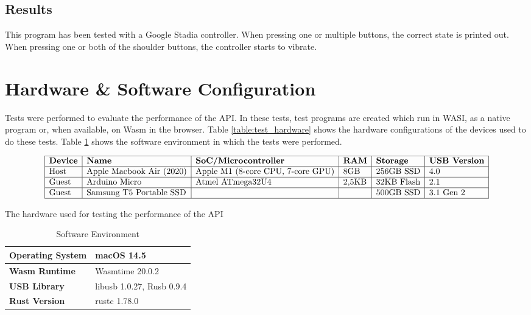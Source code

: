 \subsection{Results}
This program has been tested with a Google Stadia controller. When pressing one or multiple buttons, the correct state is printed out. When pressing one or both of the shoulder buttons, the controller starts to vibrate.



\section{Hardware \& Software Configuration}

Tests were performed to evaluate the performance of the API. In these tests, test programs are created which run in WASI, as a native program or, when available, on Wasm in the browser. Table \ref{table:test_hardware} shows the hardware configurations of the devices used to do these tests. Table \ref{table:software_environment} shows the software environment in which the tests were performed.

\begin{table}[H]
\[
\begin{array}{|l|l|l|l|l|l|}
\hline
\textbf{Device} & \textbf{Name} & \textbf{SoC/Microcontroller} & \textbf{RAM} & \textbf{Storage} & \textbf{USB Version} \\
\hline
\text{Host} & \text{Apple Macbook Air (2020)} & \text{Apple M1 (8-core CPU, 7-core GPU)} & \text{8GB} & \text{256GB SSD} & \text{4.0} \\

\hline
\text{Guest} & \text{Arduino Micro} & \text{Atmel ATmega32U4} & \text{2,5KB} & \text{32KB Flash} & \text{2.1} \\

\hline
\text{Guest} & \text{Samsung T5 Portable SSD} & \text{} & \text{} & \text{500GB SSD} & \text{3.1 Gen 2} \\
\hline
\end{array}
\]
\caption{The hardware used for testing the performance of the API}
\label{table:test_hardware}
\end{table}

\begin{table}[h]
\centering
\begin{tabular}{|l|l|}
\hline
\textbf{Operating System} & macOS 14.5 \\ \hline
\textbf{Wasm Runtime} & Wasmtime 20.0.2 \\ \hline
\textbf{USB Library} & libusb 1.0.27, Rusb 0.9.4 \\ \hline
\textbf{Rust Version} & rustc 1.78.0 \\ \hline
\end{tabular}
\caption{Software Environment}
\label{table:software_environment}
\end{table}



